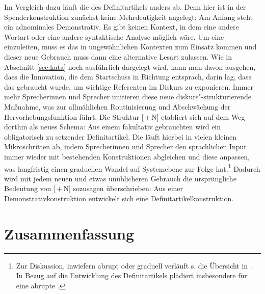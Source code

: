 Im Vergleich dazu läuft die  des Definitartikels anders ab. Denn hier ist in der Spenderkonstruktion   zunächst keine Mehrdeutigkeit angelegt: Am Anfang steht  ein adnominales Demonstrativ. Es gibt keinen Kontext, in dem eine andere Wortart oder eine andere syntaktische Analyse möglich wäre. Um eine  einzuleiten, muss es das  in ungewöhnlichen Kontexten zum Einsatz kommen und dieser neue Gebrauch muss dann eine alternative Lesart zulassen. Wie in Abschnitt \ref{sec:kata} noch ausführlich dargelegt wird, kann man davon ausgehen, dass die Innovation, die dem Startschuss in Richtung  entsprach, darin lag, dass das   gebraucht wurde, um wichtige Referenten im Diskurs zu exponieren. Immer mehr Sprecherinnen und Sprecher imitieren diese neue diskurs"-strukturierende Maßnahme, was zur allmählichen Routinisierung und Abschwächung der Hervorhebungsfunktion führt. Die Struktur [\,+\,N] etabliert sich auf dem Weg dorthin als neues Schema: Aus einem fakultativ gebrauchten  wird ein obligatorisch zu setzender Definitartikel. Die  läuft hierbei in vielen kleinen Mikroschritten ab, indem Sprecherinnen und Sprecher den sprachlichen Input immer wieder mit bestehenden Konstruktionen abgleichen und diese anpassen, was langfristig einen graduellen Wandel auf Systemebene zur Folge hat.\footnote{Zur Diskussion, inwiefern  abrupt oder graduell verläuft s. die Übersicht in \textcite[75]{Traugott2013}. In Bezug auf die Entwicklung des Definitartikels plädiert insbesondere \textcite{Schlachter2015} für eine abrupte .} 
Dadurch wird mit jedem neuen und etwas unüblicheren Gebrauch die ursprüngliche Bedeutung von [\,+\,N] sozusagen überschrieben: Aus einer Demonstrativkonstruktion   entwickelt sich eine Definitartikelkonstruktion.

  
\section{Zusammenfassung}

